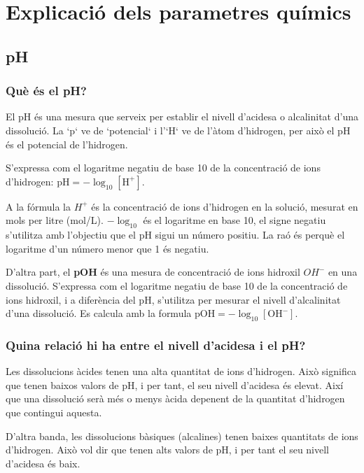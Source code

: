 \section{Explicació dels parametres químics}

\subsection{pH} \label{subsec:ph}
\subsubsection{Què és el pH?}
El pH és una mesura que serveix per establir el nivell d’acidesa o alcalinitat d'una dissolució. La `p` ve de `potencial` i l'`H` ve de l’àtom d’hidrogen, per això el pH és el potencial de l’hidrogen.

S'expressa com el logaritme negatiu de base 10 de la concentració de ions d'hidrogen: $ \text{pH} = -\log_{10} [\mathrm{H}^+] $.

A la fórmula la ${H}^+$ és la concentració de ions d'hidrogen en la solució, mesurat en mols per litre (mol/L). $-\log_{10}$ és el logaritme en base 10, el signe negatiu s'utilitza amb l'objectiu que el pH sigui un número positiu. La raó és perquè el logaritme d'un número menor que 1 és negatiu.

D'altra part, el \textbf{pOH} és una mesura de concentració de ions hidroxil ${OH}^-$ en una dissolució. S'expressa com el logaritme negatiu de base 10 de la concentració de ions hidroxil, i a diferència del pH, s'utilitza per mesurar el nivell d’alcalinitat d'una dissolució. Es calcula amb la formula  $ \text{pOH} = -\log_{10} [\mathrm{OH}^-] $.
\subsubsection{ Quina relació hi ha entre el nivell d'acidesa i el pH?}
Les dissolucions àcides tenen una alta quantitat de ions d'hidrogen. Això significa que tenen baixos valors de pH, i per tant, el seu nivell d'acidesa és elevat. Així que una dissolució serà més o menys àcida depenent de la quantitat d'hidrogen que contingui aquesta.

D'altra banda, les dissolucions bàsiques (alcalines) tenen baixes quantitats de ions d'hidrogen. Això vol dir que tenen alts valors de pH, i per tant el seu nivell d'acidesa és baix.
